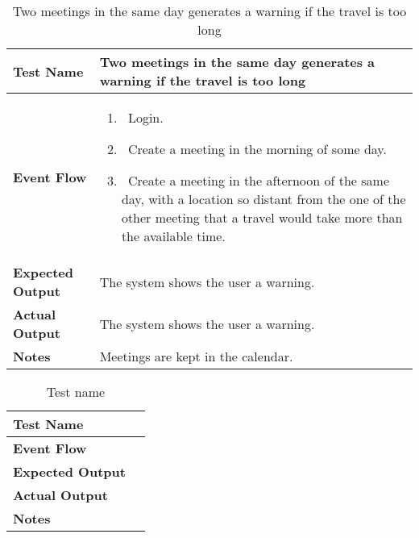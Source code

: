 \begin{table}[h]	
\centering
\def\arraystretch{1.5}
\begin{tabular}{|m{7cm}|m{7cm}|}
	\hline
	\textbf{Test Name}            &  Two meetings in the same day generates a warning if the travel is too long  \\ \hline
	\textbf{Event Flow}             &   
		\begin{enumerate}
			\item~Login.
			\item~Create a meeting in the morning of some day.
			\item~Create a meeting in the afternoon of the same day, with a location so distant from the one of the other meeting that a travel would take more than the available time.
		\end{enumerate}
	\\ \hline
	\textbf{Expected Output}  &  The system shows the user a warning.   \\ \hline
	\textbf{Actual Output}       &   The system shows the user a warning.  \\ \hline
	\textbf{Notes} &  Meetings are kept in the calendar.   \\ \hline
\end{tabular}
\caption{Two meetings in the same day generates a warning if the travel is too long}
\end{table}


\begin{table}[h]	
\centering
\def\arraystretch{1.5}
\begin{tabular}{|m{7cm}|m{7cm}|}
	\hline
	\textbf{Test Name}            &    \\ \hline
	\textbf{Event Flow}             &   \\ \hline
	\textbf{Expected Output}  &     \\ \hline
	\textbf{Actual Output}       &     \\ \hline
	\textbf{Notes} & \\ \hline
\end{tabular}
\caption{Test name}
\end{table}


